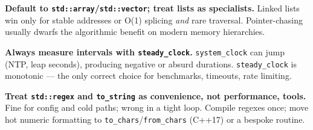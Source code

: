 \textbf{Default to \texttt{std::array}/\texttt{std::vector}; treat lists as specialists.} Linked lists win only for stable addresses or O(1) splicing \emph{and} rare traversal. Pointer-chasing usually dwarfs the algorithmic benefit on modern memory hierarchies.

\textbf{Always measure intervals with \texttt{steady\_clock}.} \texttt{system\_clock} can jump (NTP, leap seconds), producing negative or absurd durations. \texttt{steady\_clock} is monotonic --- the only correct choice for benchmarks, timeouts, rate limiting.

\textbf{Treat \texttt{std::regex} and \texttt{to\_string} as convenience, not performance, tools.} Fine for config and cold paths; wrong in a tight loop. Compile regexes once; move hot numeric formatting to \texttt{to\_chars}/\texttt{from\_chars} (C++17) or a bespoke routine.

